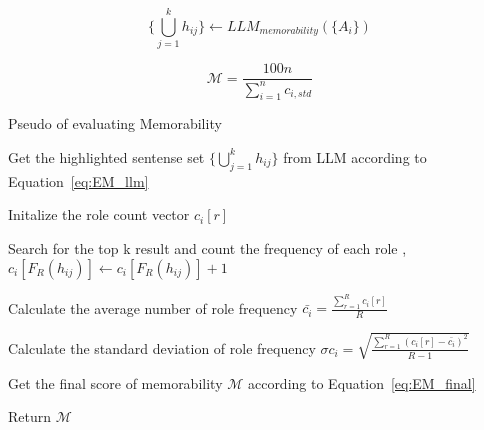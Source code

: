 \begin{equation}
    \{ \bigcup_{j=1}^{k} h_{ij} \} \leftarrow LLM_{memorability}( \{ A_{i} \})
   \label{eq:EM_llm}
\end{equation}


\begin{equation}
    \mathcal{M} = \frac{100n }{ \sum_{i=1}^{n}{c_{i,std} }}
   \label{eq:EM_final}
\end{equation}


\begin{algorithm*}[htbp]

    \renewcommand{\arraystretch}{1.3}
    \setlength{\tabcolsep}{10pt}
  
    \caption{Pseudo of evaluating Memorability }
  
    \label{alg:EWAVM_Memorability}

    Get the highlighted sentense set $  \{ \bigcup_{j=1}^{k} h_{ij} \} $ from LLM according to Equation~\ref{eq:EM_llm}
    
     {
         {
            Initalize the role count vector $ c_{i}[r] $ 
        }
        
         {
            Search for the top k result and count the frequency of each role , $ c_i[F_R(h_{ij})]\leftarrow c_i[F_R(h_{ij})]+1 $
            
        }
        
        Calculate the average number of role frequency $ \bar{c_i} = \frac{\sum_{r=1}^{R}{c_i[r]}}{ R } $

        Calculate the standard deviation of role frequency $ \sigma  c_{i} = \sqrt{\frac{\sum_{r=1}^{R}{(c_{i}[r] - \bar{c_i})^2}}{R-1}} $
    }

    Get the final score of memorability $ \mathcal{M}  $ according to Equation~\ref{eq:EM_final}

    Return $ \mathcal{M}  $  
  
\end{algorithm*}


